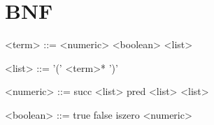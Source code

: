\documentclass[]{article}
\date{May 05, 2017}
\begin{document}
  \section{BNF}
  \setlength{\grammarparsep}{20pt}
  \setlength{\grammarindent}{8em}
  \begin{grammar}
    <term>     ::= <numeric> 
              \alt <boolean>
              \alt <list>

    <list>     ::= '(' <term>* ')'
    
    <numeric>  ::= succ <list> 
              \alt pred <list> 
              \alt <list>
    
    <boolean>  ::= true 
              \alt false 
              \alt iszero <numeric>
  \end{grammar}
\end{document}
